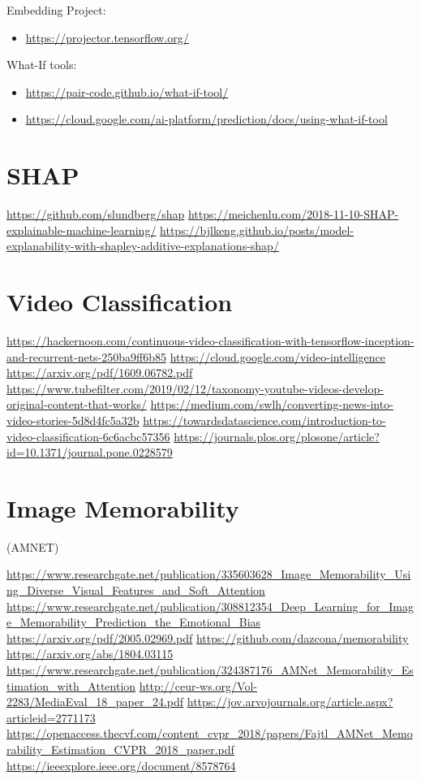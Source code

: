 \documentclass[
]{book}
\providecommand{\tightlist}{%
  \setlength{\itemsep}{0pt}\setlength{\parskip}{0pt}}
\begin{document}
Embedding Project:

\begin{itemize}
\tightlist
\item
  \url{https://projector.tensorflow.org/}
\end{itemize}

What-If tools:

\begin{itemize}
\tightlist
\item
  \url{https://pair-code.github.io/what-if-tool/}
\item
  \url{https://cloud.google.com/ai-platform/prediction/docs/using-what-if-tool}
\end{itemize}

\hypertarget{shap}{%
\section{SHAP}\label{shap}}

\url{https://github.com/slundberg/shap}
\url{https://meichenlu.com/2018-11-10-SHAP-explainable-machine-learning/}
\url{https://bjlkeng.github.io/posts/model-explanability-with-shapley-additive-explanations-shap/}

\hypertarget{video-classification}{%
\section{Video Classification}\label{video-classification}}

\url{https://hackernoon.com/continuous-video-classification-with-tensorflow-inception-and-recurrent-nets-250ba9ff6b85}
\url{https://cloud.google.com/video-intelligence}
\url{https://arxiv.org/pdf/1609.06782.pdf}
\url{https://www.tubefilter.com/2019/02/12/taxonomy-youtube-videos-develop-original-content-that-works/}
\url{https://medium.com/swlh/converting-news-into-video-stories-5d8d4fc5a32b}
\url{https://towardsdatascience.com/introduction-to-video-classification-6c6acbc57356}
\url{https://journals.plos.org/plosone/article?id=10.1371/journal.pone.0228579}

\hypertarget{image-memorability}{%
\section{Image Memorability}\label{image-memorability}}

(AMNET)

\url{https://www.researchgate.net/publication/335603628_Image_Memorability_Using_Diverse_Visual_Features_and_Soft_Attention}
\url{https://www.researchgate.net/publication/308812354_Deep_Learning_for_Image_Memorability_Prediction_the_Emotional_Bias}
\url{https://arxiv.org/pdf/2005.02969.pdf}
\url{https://github.com/dazcona/memorability}
\url{https://arxiv.org/abs/1804.03115}
\url{https://www.researchgate.net/publication/324387176_AMNet_Memorability_Estimation_with_Attention}
\url{http://ceur-ws.org/Vol-2283/MediaEval_18_paper_24.pdf}
\url{https://jov.arvojournals.org/article.aspx?articleid=2771173}
\url{https://openaccess.thecvf.com/content_cvpr_2018/papers/Fajtl_AMNet_Memorability_Estimation_CVPR_2018_paper.pdf}
\url{https://ieeexplore.ieee.org/document/8578764}
\end{document}

